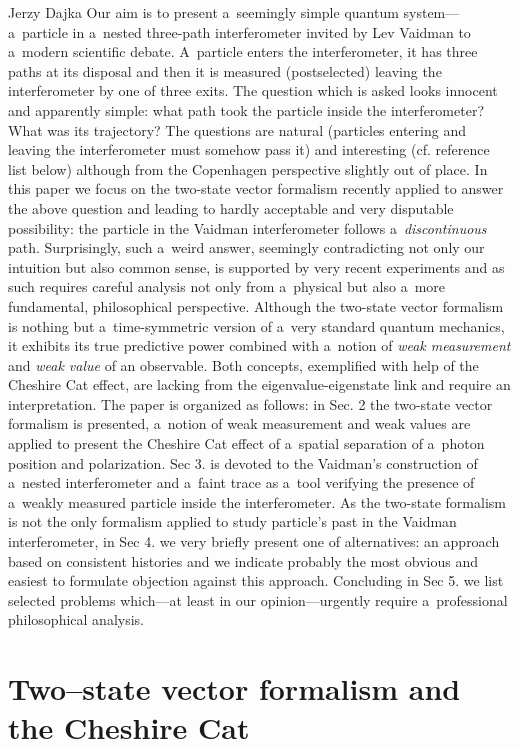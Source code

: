\begin{artengenv}{Jerzy Dajka}
Our aim is to present a~seemingly simple quantum system---a~particle in a~nested three-path interferometer invited by Lev Vaidman to a~modern scientific debate. A~particle enters the interferometer, it has three paths at its disposal and then it is measured (postselected) leaving the interferometer by one of three exits. The question which is asked looks innocent and apparently simple: what path took the particle inside the interferometer? What was its trajectory? The questions are natural (particles entering and leaving the interferometer must somehow pass it) and interesting (cf. reference list below) although  from the Copenhagen perspective slightly out of place.  In this paper we focus on  the two-state vector formalism recently applied to answer the above question and leading to hardly acceptable and very disputable possibility: the particle in the Vaidman interferometer follows a~{\it discontinuous}  path. Surprisingly, such a~weird answer, seemingly contradicting not only our intuition but also common sense,  is supported by very recent experiments and as such requires careful analysis not only from a~physical but also a~more fundamental, philosophical perspective. Although the two-state vector formalism is nothing but a~time-symmetric version of a~very standard quantum mechanics, it exhibits its true predictive power combined with a~notion of {\it weak measurement} and {\it weak value} of an observable. Both concepts, exemplified with help of the Cheshire Cat effect, are lacking from the eigenvalue-eigenstate link and require an interpretation.  The paper is organized as follows: in Sec. 2 the two-state vector formalism is presented, a~notion of weak measurement and weak values are applied to present the Cheshire Cat effect of a~spatial separation of a~photon position and polarization. Sec 3. is devoted to the Vaidman's construction of a~nested  interferometer and a~faint trace  as a~tool verifying  the presence of a~weakly measured particle inside the interferometer. As  the two-state formalism is not the only formalism applied to study particle's past in the Vaidman interferometer,    in Sec 4. we very briefly present one of  alternatives: an approach based on consistent histories and we indicate probably the  most obvious and easiest to formulate objection against this approach. Concluding in Sec 5. we list selected problems which---at least in our opinion---urgently require a~professional philosophical analysis. 

\section{Two--state vector formalism and the Cheshire Cat}


\end{artengenv}
